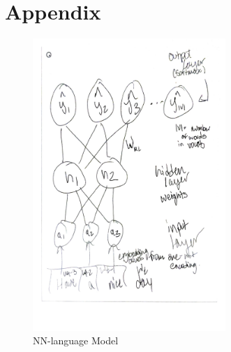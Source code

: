 \documentclass[12pt]{article}
\begin{document}
\section{Appendix}
\begin{figure}[h]
    \centering
    \includegraphics[width=0.65\textwidth]{assets/test1/nn_diagram.jpg}
    \caption{NN-language Model}
    \label{fig:nn_diagram}
\end{figure}
\end{document}
